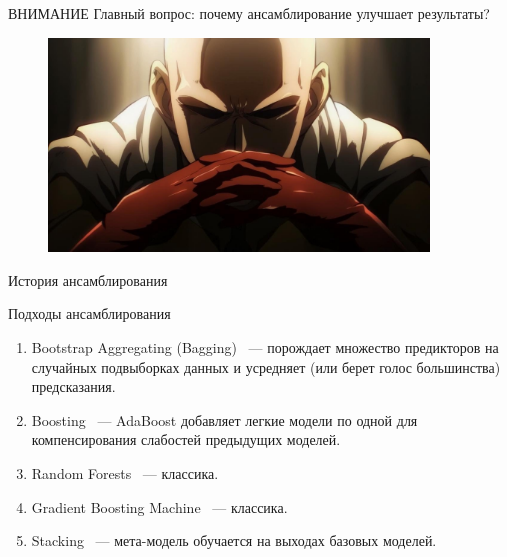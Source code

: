 \documentclass[9pt]{beamer}
\begin{document}
\begin{frame}

    \begin{block}{ВНИМАНИЕ}
        Главный вопрос: почему ансамблирование улучшает результаты?
    \end{block}

    \begin{figure}
        \centering
        \includegraphics[width=0.9\textwidth]{images/image3.jpg}
    \end{figure}
\end{frame}

\begin{frame}{История ансамблирования}
    \begin{block}{Подходы ансамблирования}
        \begin{enumerate}
            \item Bootstrap Aggregating (Bagging)~\cite{breiman96} --- порождает множество предикторов на случайных подвыборках данных и усредняет (или берет голос большинства) предсказания.
            \item Boosting~\cite{FREUND1997119} --- AdaBoost добавляет легкие модели по одной для компенсирования слабостей предыдущих моделей.
            \item Random Forests~\cite{random_forests} --- классика.
            \item Gradient Boosting Machine~\cite{gbm} --- классика.
            \item Stacking~\cite{WOLPERT1992241} --- мета-модель обучается на выходах базовых моделей.
        \end{enumerate}
    \end{block}
\end{frame}
\end{document}
